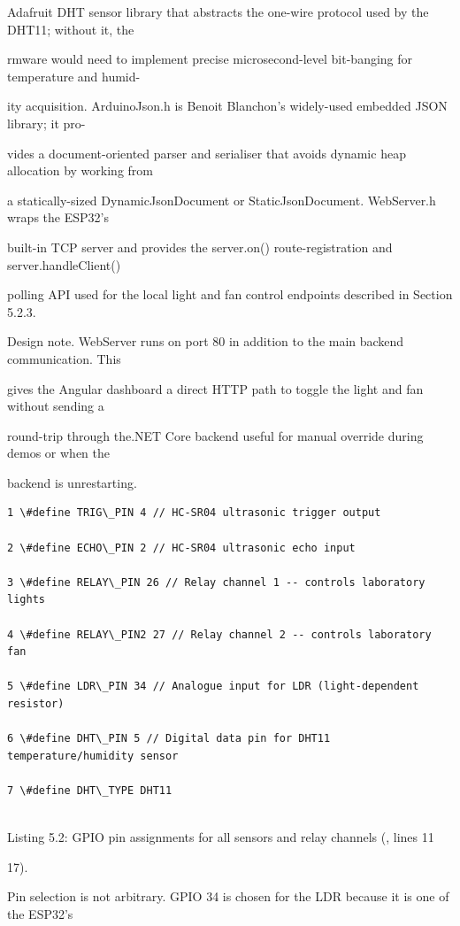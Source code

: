 Adafruit DHT sensor library that abstracts the one-wire protocol used by the DHT11; without it, the

rmware would need to implement precise microsecond-level bit-banging for temperature and humid-

ity acquisition. ArduinoJson.h is Benoit Blanchon's widely-used embedded JSON library; it pro-

vides a document-oriented parser and serialiser that avoids dynamic heap allocation by working from

a statically-sized DynamicJsonDocument or StaticJsonDocument. WebServer.h wraps the ESP32's

built-in TCP server and provides the server.on() route-registration and server.handleClient()

polling API used for the local light and fan control endpoints described in Section 5.2.3.

Design note. WebServer runs on port 80 in addition to the main backend communication. This

gives the Angular dashboard a direct HTTP path to toggle the light and fan without sending a

round-trip through the.NET Core backend  useful for manual override during demos or when the

backend is unrestarting.

\begin{listingbox}
	\begin{verbatim}
1 \#define TRIG\_PIN 4 // HC-SR04 ultrasonic trigger output

2 \#define ECHO\_PIN 2 // HC-SR04 ultrasonic echo input

3 \#define RELAY\_PIN 26 // Relay channel 1 -- controls laboratory lights

4 \#define RELAY\_PIN2 27 // Relay channel 2 -- controls laboratory fan

5 \#define LDR\_PIN 34 // Analogue input for LDR (light-dependent resistor)

6 \#define DHT\_PIN 5 // Digital data pin for DHT11 temperature/humidity sensor

7 \#define DHT\_TYPE DHT11


\end{verbatim}
\end{listingbox}
Listing 5.2: GPIO pin assignments for all sensors and relay channels (, lines 11

17).

Pin selection is not arbitrary. GPIO 34 is chosen for the LDR because it is one of the ESP32's

